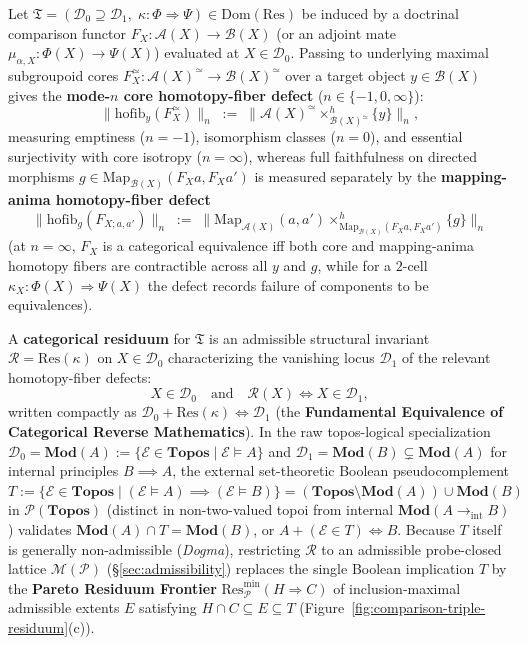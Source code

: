 \begin{definition}\label{def:residuum}%
%
Let $\mathfrak{T} = (\mathcal{D}_0 \supseteq \mathcal{D}_1, \; \kappa : \Phi \Longrightarrow \Psi) \in \mathrm{Dom}(\mathrm{Res})$ be induced by a doctrinal comparison functor $F_X : \mathcal{A}(X) \to \mathcal{B}(X)$ (or an adjoint mate $\mu_{\alpha, X} : \Phi(X) \to \Psi(X)$) evaluated at $X \in \mathcal{D}_0$. Passing to underlying maximal subgroupoid cores $F_X^{\simeq} : \mathcal{A}(X)^{\simeq} \to \mathcal{B}(X)^{\simeq}$ over a target object $y \in \mathcal{B}(X)$ gives the \textbf{mode-$n$ core homotopy-fiber defect} ($n \in \{-1, 0, \infty\}$):
\[
  \bigl\|\mathrm{hofib}_y(F_X^{\simeq})\bigr\|_n \;:=\; \bigl\|\mathcal{A}(X)^{\simeq} \times^h_{\mathcal{B}(X)^{\simeq}} \{y\}\bigr\|_n,
\]
measuring emptiness ($n = -1$), isomorphism classes ($n = 0$), and essential surjectivity with core isotropy ($n = \infty$), whereas full faithfulness on directed morphisms $g \in \mathrm{Map}_{\mathcal{B}(X)}(F_X a, F_X a')$ is measured separately by the \textbf{mapping-anima homotopy-fiber defect}
\[
  \bigl\|\mathrm{hofib}_g(F_{X; a,a'})\bigr\|_n \;:=\; \bigl\|\mathrm{Map}_{\mathcal{A}(X)}(a, a') \times^h_{\mathrm{Map}_{\mathcal{B}(X)}(F_X a, F_X a')} \{g\}\bigr\|_n
\]
(at $n = \infty$, $F_X$ is a categorical equivalence iff both core and mapping-anima homotopy fibers are contractible across all $y$ and $g$, while for a $2$-cell $\kappa_X : \Phi(X) \Rightarrow \Psi(X)$ the defect records failure of components to be equivalences).

A \textbf{categorical residuum} for $\mathfrak{T}$ is an admissible structural invariant $\mathcal{R} = \mathrm{Res}(\kappa)$ on $X \in \mathcal{D}_0$ characterizing the vanishing locus $\mathcal{D}_1$ of the relevant homotopy-fiber defects:
\[
  X \in \mathcal{D}_0 \quad \text{and} \quad \mathcal{R}(X) \iff X \in \mathcal{D}_1,
\]
written compactly as $\mathcal{D}_0 + \mathrm{Res}(\kappa) \iff \mathcal{D}_1$ (the \textbf{Fundamental Equivalence of Categorical Reverse Mathematics}). In the raw topos-logical specialization $\mathcal{D}_0 = \mathbf{Mod}(A) := \{\mathcal{E} \in \mathbf{Topos} \mid \mathcal{E} \models A\}$ and $\mathcal{D}_1 = \mathbf{Mod}(B) \subsetneq \mathbf{Mod}(A)$ for internal principles $B \implies A$, the external set-theoretic Boolean pseudocomplement $T := \{\mathcal{E} \in \mathbf{Topos} \mid (\mathcal{E} \models A) \implies (\mathcal{E} \models B)\} = (\mathbf{Topos} \setminus \mathbf{Mod}(A)) \cup \mathbf{Mod}(B)$ in $\mathcal{P}(\mathbf{Topos})$ (distinct in non-two-valued topoi from internal $\mathbf{Mod}(A \to_{\mathrm{int}} B)$) validates $\mathbf{Mod}(A) \cap T = \mathbf{Mod}(B)$, or $A + (\mathcal{E} \in T) \iff B$. Because $T$ itself is generally non-admissible (\emph{Dogma}), restricting $\mathcal{R}$ to an admissible probe-closed lattice $\mathcal{M}(\mathcal{P})$ (§\ref{sec:admissibility}) replaces the single Boolean implication $T$ by the \textbf{Pareto Residuum Frontier} $\mathrm{Res}_{\mathcal{P}}^{\min}(H \Rightarrow C)$ of inclusion-maximal admissible extents $E$ satisfying $H \cap C \subseteq E \subseteq T$ (Figure~\ref{fig:comparison-triple-residuum}(c)).
\end{definition}

